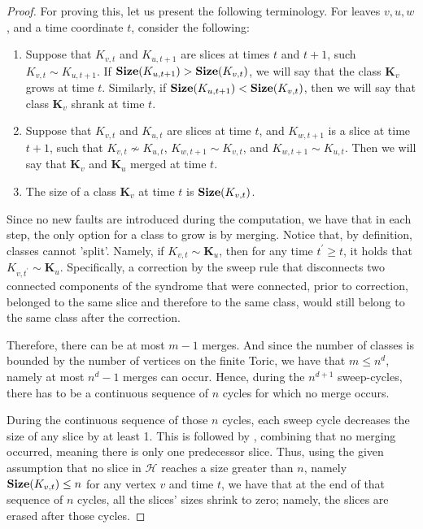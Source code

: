\begin{proof}
  For proving this, let us present the following terminology. For leaves $v,u,w$, and a time coordinate $t$, consider the following: 
  \begin{enumerate}
    \item Suppose that $K_{v,t}$ and $K_{u,t+1}$ are slices at times $t$ and $t+1$, such $K_{v,t}\sim K_{u,t+1}$. If $\mathbf{Size}(K_{u,t+1}) > \mathbf{Size}(K_{v,t})$, we will say that the class $\mathbf{K}_{v}$ grows at time $t$. Similarly, if $\mathbf{Size}(K_{u,t+1}) < \mathbf{Size}(K_{v,t})$, then we will say that class $\mathbf{K}_{v}$ shrank at time $t$.
    \item Suppose that $K_{v,t}$ and $K_{u,t}$ are slices at time $t$, and $K_{w,t+1}$ is a slice at time $t+1$, such that $K_{v,t}\not\sim K_{u,t}$, $K_{w,t+1}\sim K_{v,t}$, and $K_{w,t+1}\sim K_{u,t}$. Then we will say that $\textbf{K}_{v}$ and $\textbf{K}_{u}$ merged at time $t$.
    \item The size of a class $\mathbf{K}_{v}$ at time $t$ is $\mathbf{Size}(K_{v,t})$.
  \end{enumerate}
  Since no new faults are introduced during the computation, we have that in each step, the only option for a class to grow is by merging. Notice that, by definition, classes cannot 'split'. Namely, if $K_{v,t}\sim \mathbf{K}_{u}$, then for any time $t^{\prime} \ge t$, it holds that $K_{v,t^{\prime}} \sim \textbf{K}_{u}$. Specifically, a correction by the sweep rule that disconnects two connected components of the syndrome that were connected, prior to correction, belonged to the same slice and therefore to the same class, would still belong to the same class after the correction.


Therefore, there can be at most $m-1$ merges. And since the number of classes is bounded by the number of vertices on the finite Toric, we have that $m \le n^{d}$, namely at most $n^{d}-1$ merges can occur. Hence, during the $n^{d+1}$ sweep-cycles, there has to be a continuous sequence of $n$ cycles for which no merge occurs. 



During the continuous sequence of those $n$ cycles, each sweep cycle decreases the size of any slice by at least 1. This is followed by , combining that no merging occurred, meaning there is only one predecessor slice. Thus, using the given assumption that no slice in $\mathcal{H}$ reaches a size greater than $n$, namely $\mathbf{Size}(K_{v,t}) \le n$ for any vertex $v$ and time $t$, we have that at the end of that sequence of $n$ cycles, all the slices' sizes shrink to zero; namely, the slices are erased after those cycles.
\end{proof}




